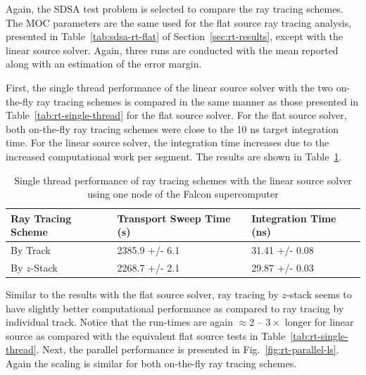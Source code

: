 Again, the SDSA test problem is selected to compare the ray tracing schemes. The \ac{MOC} parameters are the same used for the flat source ray tracing analysis, presented in Table~\ref{tab:sdsa-rt-flat} of Section~\ref{sec:rt-results}, except with the linear source solver. Again, three runs are conducted with the mean reported along with an estimation of the error margin.

First, the single thread performance of the linear source solver with the two on-the-fly ray tracing schemes is compared in the same manner as those presented in Table~\ref{tab:rt-single-thread} for the flat source solver. For the flat source solver, both on-the-fly ray tracing schemes were close to the 10 ns target integration time. For the linear source solver, the integration time increases due to the increased computational work per segment. The results are shown in Table~\ref{tab:rt-single-thread-ls}.

\begin{table}[ht]
	\centering
	\caption{Single thread performance of ray tracing schemes with the linear source solver using one node of the Falcon supercomputer}
	\medskip
	\begin{tabular}{l|l|l}
		\hline
		Ray Tracing Scheme & Transport Sweep Time (s) & Integration Time (ns) \\
		\hline
		By Track & 2385.9 +/- 6.1 & 31.41 +/- 0.08 \\
		By $z$-Stack & 2268.7 +/- 2.1 & 29.87 +/- 0.03 \\
		\hline
	\end{tabular}
	\label{tab:rt-single-thread-ls}
\end{table}

Similar to the results with the flat source solver, ray tracing by $z$-stack seems to have slightly better computational performance as compared to ray tracing by individual track. Notice that the run-times are again $\approx 2$ -- $3\times$ longer for linear source as compared with the equivalent flat source tests in Table~\ref{tab:rt-single-thread}. Next, the parallel performance is presented in Fig.~\ref{fig:rt-parallel-ls}. Again the scaling is similar for both on-the-fly ray tracing schemes.

